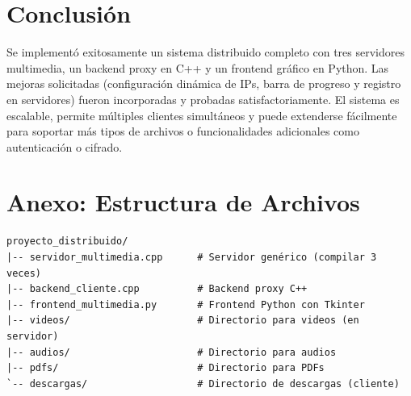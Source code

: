 \documentclass[12pt]{article}
\begin{document}
\section{Conclusión}

Se implementó exitosamente un sistema distribuido completo con tres servidores multimedia, un backend proxy en C++ y un frontend gráfico en Python. Las mejoras solicitadas (configuración dinámica de IPs, barra de progreso y registro en servidores) fueron incorporadas y probadas satisfactoriamente. El sistema es escalable, permite múltiples clientes simultáneos y puede extenderse fácilmente para soportar más tipos de archivos o funcionalidades adicionales como autenticación o cifrado.

\section*{Anexo: Estructura de Archivos}
\begin{verbatim}
proyecto_distribuido/
|-- servidor_multimedia.cpp      # Servidor genérico (compilar 3 veces)
|-- backend_cliente.cpp          # Backend proxy C++
|-- frontend_multimedia.py       # Frontend Python con Tkinter
|-- videos/                      # Directorio para videos (en servidor)
|-- audios/                      # Directorio para audios
|-- pdfs/                        # Directorio para PDFs
`-- descargas/                   # Directorio de descargas (cliente)
\end{verbatim}
\end{document}
